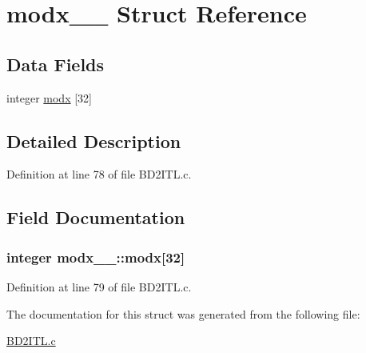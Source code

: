 \hypertarget{structmodx__1__}{}\section{modx\+\_\+\_\+ Struct Reference}
\label{structmodx__1__}
\subsection*{Data Fields}
\begin{DoxyCompactItemize}
\item 
integer \hyperlink{structmodx__1___acac2cf65b5e98090473d47fe1e09761f}{modx} \mbox{[}32\mbox{]}
\end{DoxyCompactItemize}


\subsection{Detailed Description}


Definition at line 78 of file B\+D2\+I\+T\+L.\+c.



\subsection{Field Documentation}
\subsubsection[{\texorpdfstring{modx}{modx}}]{\setlength{\rightskip}{0pt plus 5cm}integer modx\+\_\+\_\+\+::modx\mbox{[}32\mbox{]}}\hypertarget{structmodx__1___acac2cf65b5e98090473d47fe1e09761f}{}\label{structmodx__1___acac2cf65b5e98090473d47fe1e09761f}


Definition at line 79 of file B\+D2\+I\+T\+L.\+c.



The documentation for this struct was generated from the following file\+:\begin{DoxyCompactItemize}
\item 
\hyperlink{BD2ITL_8c}{B\+D2\+I\+T\+L.\+c}\end{DoxyCompactItemize}
